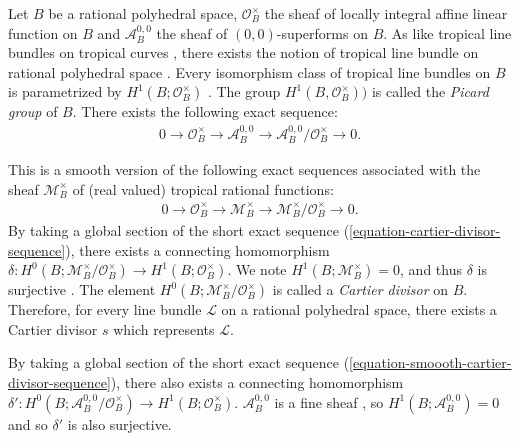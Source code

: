 \documentclass[a4paper,dvipdfmx,reqno,12pt]{amsart}
\theoremstyle{definition}
\newcommand{\mcal}[1]{\mathcal{#1}}%
\numberwithin{equation}{section}
\begin{document}
Let $B$ be a rational polyhedral space, 
$\mathcal{O}^{\times}_B$ the sheaf of 
locally integral affine linear function on $B$
and $\mathcal{A}^{0,0}_B$ the sheaf of 
$(0,0)$-superforms on $B$. 
As like tropical line bundles on tropical curves
\cite[Definition 4.4]{mikhalkinTropicalCurvesTheir2008a},
there exists the notion of tropical line bundle on 
rational polyhedral space
\cite[Definition 3.12]{gross2019sheaftheoretic}.
Every isomorphism class of 
tropical line bundles on $B$ is parametrized by 
$H^{1}(B;\mathcal{O}^{\times}_B)$
\cite[Proposition 3.13]{gross2019sheaftheoretic}.
The group $H^{1}(B, \mcal{O}^{\times}_B))$ is called 
the \emph{Picard group} of $B$.
There exists the following exact sequence:
\begin{align}
\label{equation-smoooth-cartier-divisor-sequence}
0\to \mathcal{O}^{\times}_B \to
\mathcal{A}^{0,0}_{B} \to
\mathcal{A}^{0,0}_{B}/\mathcal{O}^{\times}_B\to 0.
\end{align}

This is a smooth version of the following exact
sequences associated with the sheaf 
$\mcal{M}_B^{\times}$
of (real valued) tropical rational functions:
\begin{align}
\label{equation-cartier-divisor-sequence}
0 \to \mcal{O}^{\times}_B \to \mcal{M}_B^{\times} 
\to \mcal{M}_B^{\times}/\mathcal{O}^{\times}_B\to 0.
\end{align}
By taking a global section of the
short exact sequence 
(\ref{equation-cartier-divisor-sequence}),
there exists a connecting homomorphism 
$\delta \colon 
H^{0}(B;\mcal{M}_B^{\times}/\mathcal{O}^{\times}_B)
\to H^{1}(B;\mathcal{O}^{\times}_B)$.
We note $H^{1}(B;\mcal{M}_{B}^{\times})=0$, 
and thus $\delta$ is surjective
\cite[Lemma 4.5, Proposition 4.6]{MR3894860}.
The element $H^{0}(B;\mcal{M}_B^{\times}/\mathcal{O}^{\times}_B)$
is called a \emph{Cartier divisor} on $B$.
Therefore, for every line bundle $\mathcal{L}$ on a rational polyhedral 
space, there exists a Cartier divisor $s$ 
which represents $\mathcal{L}$.

By taking a global section of the
short exact sequence
(\ref{equation-smoooth-cartier-divisor-sequence}),
there also exists a connecting homomorphism 
$\delta' \colon 
H^{0}(B;\mathcal{A}^{0,0}_{B}/\mathcal{O}^{\times}_B)
\to H^{1}(B;\mathcal{O}^{\times}_B)$. 
$\mathcal{A}^{0,0}_B$ is a fine sheaf 
\cite[Proposition 2.26]{MR3903579}, so 
$H^{1}(B;\mathcal{A}^{0,0}_B)=0$ and 
so $\delta'$ is also surjective.
\end{document}
